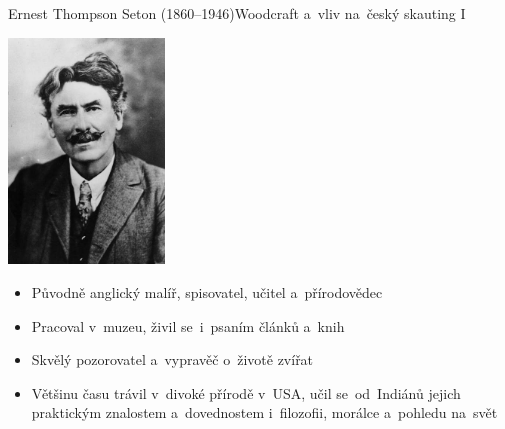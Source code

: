 \documentclass[compress, ucs, xelatex, 11pt, xcolor=dvipsnames, print,
	hyperref={
		bookmarks=true,
		unicode=true,
		colorlinks=true,
		pdftitle={Skautska vychovna metoda},
		plainpages=false,
		pdfauthor={Vojtech Zeisek},
		pdfsubject={Skautska vychovna metoda a jeji vyvoj za posledni stoleti a desetileti},
		pdfcreator={XeLaTeX},
		pdfkeywords={Junak, Pedagogika, Skaut, Skauting, Vychovna metoda},
		linkcolor=Black,
		anchorcolor=Black,
		citecolor=OliveGreen,
		filecolor=OliveGreen,
		menucolor=Black,
		urlcolor=OliveGreen,
		pdftex},
	url={hyphens, lowtilde} %
	]{beamer}
\begin{document}
\begin{frame}{Ernest Thompson Seton (1860--1946)}{Woodcraft a~vliv na~český skauting I}
	\begin{multicols}{2}
		\begin{center}
			\includegraphics[height=6cm]{seton.jpg}
		\end{center}
		\columnbreak
		\begin{itemize}
			\item Původně anglický malíř, spisovatel, učitel a~přírodovědec
			\item Pracoval v~muzeu, živil se~i~psaním článků a~knih
			\item Skvělý pozorovatel a~vypravěč o~životě zvířat
			\item Většinu času trávil v~divoké přírodě v~USA, učil se~od~Indiánů jejich praktickým znalostem a~dovednostem i~filozofii, morálce a~pohledu na~svět
		\end{itemize}
	\end{multicols}
\end{frame}
\end{document}
